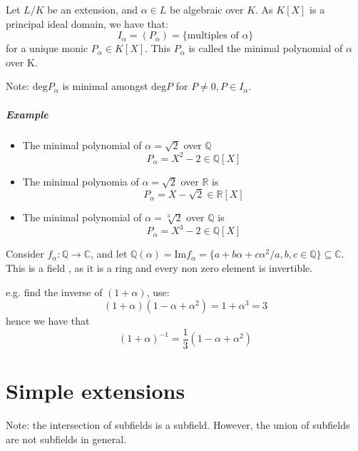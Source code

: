 \begin{definition} \label{def:5}
  Let $L/K$ be an extension, and $\alpha \in L$ be algebraic over $K$. As $K[X]$ is a principal ideal domain, we have that:
  \begin{equation*}
    I_\alpha = (P_\alpha) = \{ \text{multiples of } \alpha \}
  \end{equation*}
  for a unique monic $P_\alpha \in K[X]$. This $P_\alpha$ is called the minimal polynomial of $\alpha$ over K. 
\end{definition}
Note: $\text{deg} P_\alpha$ is minimal amongst $\text{deg} P$ for $P \neq 0, P \in I_\alpha$.

\subparagraph{Example}
\begin{itemize}
\item The minimal polynomial of $\alpha = \sqrt{2}$ over $\mathbb{Q}$
  \begin{equation*}
    P_\alpha = X^2 -2 \in \mathbb{Q}[X]
  \end{equation*}
\item The minimal polynomia of $\alpha = \sqrt{2}$ over $\mathbb{R}$ is 
  \begin{equation*}
    P_\alpha = X-\sqrt{2} \in \mathbb{R}[X]
  \end{equation*}
\item The minimal polynomial of $\alpha = \sqrt[3]{2}$ over $\mathbb{Q}$ is
  \begin{equation*}
    P_\alpha = X^3 - 2 \in \mathbb{Q}[X]
  \end{equation*}
\end{itemize}

Consider $f_\alpha : \mathbb{Q} \rightarrow \mathbb{C}$, and let $\mathbb{Q}(\alpha) = \text{Im} f_\alpha = \{ a + b\alpha + c\alpha^2 / a, b, c \in \mathbb{Q}\} \subseteq \mathbb{C}$. This is a field , as it is a ring and every non zero element is invertible. 

e.g. find the inverse of $(1+\alpha)$, use:
\begin{equation*}
  (1+\alpha)(1-\alpha+\alpha^2) = 1+\alpha^3 = 3
\end{equation*}
hence we have that
\begin{equation*}
  (1+\alpha)^{-1} = \frac{1}{3}(1-\alpha+\alpha^2)
\end{equation*}

\section{Simple extensions}
Note: the intersection of subfields is a subfield. However, the union of subfields are not subfields in general.

